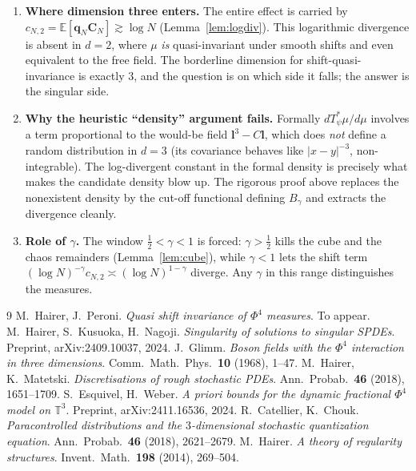 \documentclass[11pt]{article}
\newcommand{\T}{\mathbb{T}}
\newcommand{\E}{\mathbb{E}}
\newcommand{\Lin}{\mathbf{l}}   %
\newcommand{\Lsq}{\mathbf{q}}   %
\newcommand{\Iqc}{\mathbf{C}}   %
\begin{document}
\begin{enumerate}\setlength\itemsep{4pt}
\item \textbf{Where dimension three enters.} The entire effect is carried by
$c_{N,2}=\E[\Lsq_N\Iqc_N]\gtrsim\log N$ (Lemma~\ref{lem:logdiv}). This logarithmic
divergence is absent in $d=2$, where $\mu$ \emph{is} quasi-invariant under smooth
shifts and even equivalent to the free field. The borderline dimension for
shift-quasi-invariance is exactly $3$, and the question is on which side it falls;
the answer is the singular side.

\item \textbf{Why the heuristic ``density'' argument fails.} Formally
$dT_\psi^*\mu/d\mu$ involves a term proportional to the would-be field
$\Lin^3-C\Lin$, which does \emph{not} define a random distribution in $d=3$ (its
covariance behaves like $|x-y|^{-3}$, non-integrable). The log-divergent constant
in the formal density is precisely what makes the candidate density blow up. The
rigorous proof above replaces the nonexistent density by the cut-off functional
defining $B_\gamma$ and extracts the divergence cleanly.

\item \textbf{Role of $\gamma$.} The window $\tfrac12<\gamma<1$ is forced:
$\gamma>\tfrac12$ kills the cube and the chaos remainders (Lemma~\ref{lem:cube}),
while $\gamma<1$ lets the shift term $(\log N)^{-\gamma}c_{N,2}\asymp(\log
N)^{1-\gamma}$ diverge. Any $\gamma$ in this range distinguishes the measures.
\end{enumerate}

\begin{thebibliography}{9}
 M.~Hairer, J.~Peroni.
  \emph{Quasi shift invariance of $\Phi^4$ measures}. To appear.
 M.~Hairer, S.~Kusuoka, H.~Nagoji.
  \emph{Singularity of solutions to singular SPDEs}.
  Preprint, arXiv:2409.10037, 2024.
 J.~Glimm.
  \emph{Boson fields with the $\Phi^4$ interaction in three dimensions}.
  Comm.\ Math.\ Phys.\ \textbf{10} (1968), 1--47.
 M.~Hairer, K.~Matetski.
  \emph{Discretisations of rough stochastic PDEs}.
  Ann.\ Probab.\ \textbf{46} (2018), 1651--1709.
 S.~Esquivel, H.~Weber.
  \emph{A priori bounds for the dynamic fractional $\Phi^4$ model on $\T^3$}.
  Preprint, arXiv:2411.16536, 2024.
 R.~Catellier, K.~Chouk.
  \emph{Paracontrolled distributions and the $3$-dimensional stochastic
  quantization equation}. Ann.\ Probab.\ \textbf{46} (2018), 2621--2679.
 M.~Hairer.
  \emph{A theory of regularity structures}. Invent.\ Math.\ \textbf{198} (2014),
  269--504.
\end{thebibliography}
\end{document}
